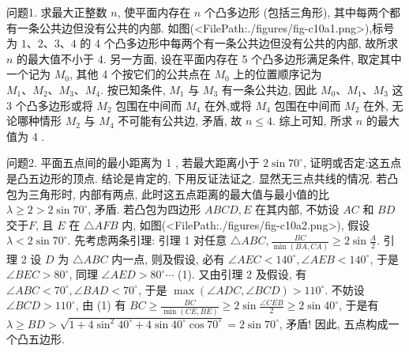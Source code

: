 
问题1. 求最大正整数 $n$, 使平面内存在 $n$ 个凸多边形 (包括三角形), 其中每两个都有一条公共边但没有公共的内部.
如图(<FilePath:./figures/fig-c10a1.png>),标号为 $1 、 2 、 3 、 4$ 的 4 个凸多边形中每两个有一条公共边但没有公共的内部, 故所求 $n$ 的最大值不小于 4. 另一方面, 设在平面内存在 5 个凸多边形满足条件, 取定其中一个记为 $M_0$, 其他 4 个按它们的公共点在 $M_0$ 上的位置顺序记为 $M_1 、 M_2 、 M_3 、 M_4$. 按已知条件, $M_1$ 与 $M_3$ 有一条公共边, 因此 $M_0 、 M_1 、 M_3$ 这 3 个凸多边形或将 $M_2$ 包围在中间而 $M_4$ 在外,或将 $M_4$ 包围在中间而 $M_2$ 在外, 无论哪种情形 $M_2$ 与 $M_4$ 不可能有公共边, 矛盾, 故 $n \leqslant 4$. 综上可知, 所求 $n$ 的最大值为 4 .



问题2. 平面五点间的最小距离为 1 , 若最大距离小于 $2 \sin 70^{\circ}$, 证明或否定:这五点是凸五边形的顶点.
结论是肯定的, 下用反证法证之.
显然无三点共线的情况.
若凸包为三角形时, 内部有两点, 此时这五点距离的最大值与最小值的比 $\lambda \geqslant 2> 2 \sin 70^{\circ}$, 矛盾.
若凸包为四边形 $A B C D, E$ 在其内部, 不妨设 $A C$ 和 $B D$ 交于$F$, 且 $E$ 在 $\triangle A F B$ 内, 如图(<FilePath:./figures/fig-c10a2.png>), 假设 $\lambda<2 \sin 70^{\circ}$. 先考虑两条引理: 引理 1 对任意 $\triangle A B C, \frac{B C}{\min (B A, C A)} \geqslant 2 \sin \frac{A}{2}$. 引理 2 设 $D$ 为 $\triangle A B C$ 内一点, 则及假设, 必有 $\angle A E C<140^{\circ}, \angle A E B<140^{\circ}$, 于是 $\angle B E C>80^{\circ}$, 同理 $\angle A E D>80^{\circ} \cdots$ (1). 又由引理 2 及假设, 有 $\angle A B C<70^{\circ}, \angle B A D<70^{\circ}$, 于是 $\max (\angle A D C, \angle B C D)>110^{\circ}$. 不妨设 $\angle B C D>110^{\circ}$, 由 (1) 有 $B C \geqslant \frac{B C}{\min (C E, B E)} \geqslant 2 \sin \frac{\angle C E B}{2} \geqslant 2 \sin 40^{\circ}$, 于是有 $\lambda \geqslant B D> \sqrt{1+4 \sin ^2 40^{\circ}+4 \sin 40^{\circ} \cos 70^{\circ}}=2 \sin 70^{\circ}$, 矛盾! 因此, 五点构成一个凸五边形.


